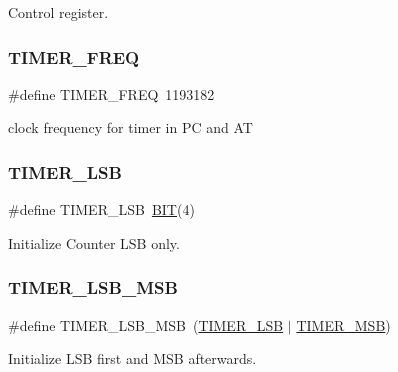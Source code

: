 Control register. 

\mbox{\label{group__i8254_gacf926951944b6cf370b7229ebd50dd8b}} 
\subsubsection{\texorpdfstring{T\+I\+M\+E\+R\+\_\+\+F\+R\+EQ}{TIMER\_FREQ}}
{\footnotesize\ttfamily \#define T\+I\+M\+E\+R\+\_\+\+F\+R\+EQ~1193182}



clock frequency for timer in PC and AT 

\mbox{\label{group__i8254_gac18cb814ebd0d67235392c330e0e3504}} 
\subsubsection{\texorpdfstring{T\+I\+M\+E\+R\+\_\+\+L\+SB}{TIMER\_LSB}}
{\footnotesize\ttfamily \#define T\+I\+M\+E\+R\+\_\+\+L\+SB~\mbox{\hyperlink{group__uart_ga3a8ea58898cb58fc96013383d39f482c}{B\+IT}}(4)}



Initialize Counter L\+SB only. 

\mbox{\label{group__i8254_ga8c0f1933323274c765e23837e4fbc8c7}} 
\subsubsection{\texorpdfstring{T\+I\+M\+E\+R\+\_\+\+L\+S\+B\+\_\+\+M\+SB}{TIMER\_LSB\_MSB}}
{\footnotesize\ttfamily \#define T\+I\+M\+E\+R\+\_\+\+L\+S\+B\+\_\+\+M\+SB~(\mbox{\hyperlink{group__i8254_gac18cb814ebd0d67235392c330e0e3504}{T\+I\+M\+E\+R\+\_\+\+L\+SB}} $\vert$ \mbox{\hyperlink{group__i8254_ga2a8a6d363c612d756cd8d78480f7cd04}{T\+I\+M\+E\+R\+\_\+\+M\+SB}})}



Initialize L\+SB first and M\+SB afterwards. 

